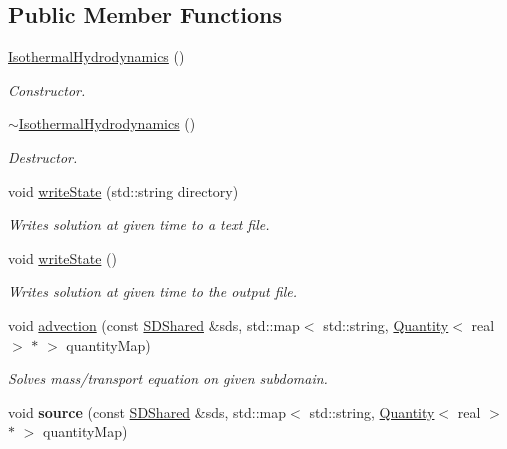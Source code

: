 \subsection*{Public Member Functions}
\begin{DoxyCompactItemize}
\item 
\mbox{\label{classIsothermalHydrodynamics_a19817c5b7905d50dda212fab3bcc30fa}} 
\hyperlink{classIsothermalHydrodynamics_a19817c5b7905d50dda212fab3bcc30fa}{Isothermal\+Hydrodynamics} ()
\begin{DoxyCompactList}\small\item\em Constructor. \end{DoxyCompactList}\item 
\mbox{\label{classIsothermalHydrodynamics_a5b0e4b481852aa942c61dd7c28bb64e0}} 
\hyperlink{classIsothermalHydrodynamics_a5b0e4b481852aa942c61dd7c28bb64e0}{$\sim$\+Isothermal\+Hydrodynamics} ()
\begin{DoxyCompactList}\small\item\em Destructor. \end{DoxyCompactList}\item 
void \hyperlink{classIsothermalHydrodynamics_a58488558d3ca76d8f2ee50ad73f3a99f}{write\+State} (std\+::string directory)
\begin{DoxyCompactList}\small\item\em Writes solution at given time to a text file. \end{DoxyCompactList}\item 
void \hyperlink{classIsothermalHydrodynamics_aee2e4f4a44742c9a93062bf64b4a8afa}{write\+State} ()
\begin{DoxyCompactList}\small\item\em Writes solution at given time to the output file. \end{DoxyCompactList}\item 
void \hyperlink{classIsothermalHydrodynamics_a735f87131064a760670eb884743d513f}{advection} (const \hyperlink{classSDShared}{S\+D\+Shared} \&sds, std\+::map$<$ std\+::string, \hyperlink{classQuantity}{Quantity}$<$ real $>$ $\ast$ $>$ quantity\+Map)
\begin{DoxyCompactList}\small\item\em Solves mass/transport equation on given subdomain. \end{DoxyCompactList}\item 
\mbox{\label{classIsothermalHydrodynamics_a55ca7b1792eff570eb8954469072a6fb}} 
void {\bfseries source} (const \hyperlink{classSDShared}{S\+D\+Shared} \&sds, std\+::map$<$ std\+::string, \hyperlink{classQuantity}{Quantity}$<$ real $>$ $\ast$ $>$ quantity\+Map)
\end{DoxyCompactItemize}
